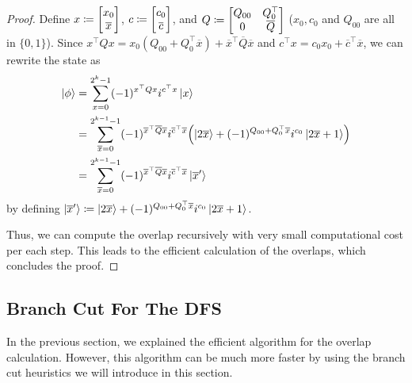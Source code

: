 \documentclass[\main/main]{subfiles}
\begin{document}
\begin{proof}
  Define $x \coloneqq \begin{bmatrix}
      x_0 \\
      \overline{x}
    \end{bmatrix}$,
  $c \coloneqq \begin{bmatrix}
      c_0 \\
      \overline{c}
    \end{bmatrix}$, and
  $Q \coloneqq \begin{bmatrix}
      Q_{00} & Q_{0}^\top   \\
      0      & \overline{Q}
    \end{bmatrix}$
  ($x_0,c_0$ and $Q_{00}$ are all in $\{0,1\}$).
  Since
  $x^\top Q x = x_0 (Q_{00}+Q_0^\top \overline{x}) + \overline{x}^\top \overline{Q} \overline{x}$
  and
  $c^\top x = c_0 x_0 + \overline{c}^\top \overline{x}$,
  we can rewrite the state as
  \begin{align*}
    \ket{\phi} & = \sum_{x=0}^{2^k-1} (-1)^{x^\top Q x} i^{c^\top x} \ket{x}                                                                                   \\
               & = \sum_{\overline{x}=0}^{2^{k-1}-1} (-1)^{\overline{x}^\top \overline{Q} \overline{x}} i^{\overline{c}^\top \overline{x}}
    \qty(\ket{2\overline{x}} + (-1)^{Q_{00}+Q_0^\top \overline{x}} i^{c_0} \ket{2\overline{x}+1})                                                              \\
               & = \sum_{\overline{x}=0}^{2^{k-1}-1} (-1)^{\overline{x}^\top \overline{Q} \overline{x}} i^{\overline{c}^\top \overline{x}} \ket{\overline{x}'}
  \end{align*}
  by defining $\ket{\overline{x}'} \coloneqq \ket{2\overline{x}} + (-1)^{Q_{00}+Q_0^\top \overline{x}} i^{c_0} \ket{2\overline{x}+1}$.

  Thus, we can compute the overlap recursively
  with very small computational cost per each step.
  This leads to the efficient calculation of the overlaps,
  which concludes the proof.
\end{proof}

\subsection{Branch Cut For The DFS}

In the previous section, we explained the efficient algorithm for the overlap calculation.
However, this algorithm can be much more faster
by using the branch cut heuristics we will introduce in this section.
\end{document}
